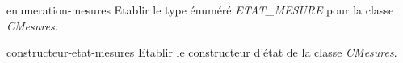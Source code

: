 {
    \begin{question}{enumeration-mesures}
        Etablir le type énuméré \emph{ETAT\_MESURE} pour la classe \emph{CMesures}.
    \end{question}

    \begin{question}{constructeur-etat-mesures}
        Etablir le constructeur d'état de la classe \emph{CMesures}. 
        \end{question}

}